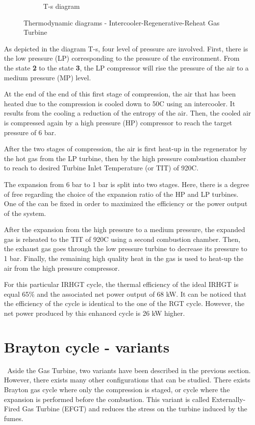 \begin{figure}[h]
\begin{subfigure}[b]{0.4\textwidth}
         \caption{T-s diagram}
         \label{fig:C5_Ts_IRHGT}
     \end{subfigure}
        \caption{Thermodynamic diagrams - Intercooler-Regenerative-Reheat Gas Turbine}
        \label{fig:C5_thermo_diagram_IRHGT}
\end{figure}

As depicted in the diagram T-s, four level of pressure are involved. First, there is the low pressure (LP) corresponding to the pressure of the environment. From the state \textbf{2} to the state \textbf{3}, the LP compressor will rise the pressure of the air to a medium pressure (MP) level. 

At the end of the end of this first stage of compression, the air that has been heated due to the compression is cooled down to 50\degree C using an intercooler. It results from the cooling a reduction of the entropy of the air. Then, the cooled air is compressed again by a high pressure (HP) compressor to reach the target pressure of 6 bar.

After the two stages of compression, the air is first heat-up in the regenerator by the hot gas from the LP turbine, then by the high pressure combustion chamber to reach to desired Turbine Inlet Temperature (or TIT) of 920\degree C. 

The expansion from 6 bar to 1 bar is split into two stages. Here, there is a degree of free regarding the choice of the expansion ratio of the HP and LP turbines. One of the can be fixed in order to maximized the efficiency or the power output of the system. 

After the expansion from the high pressure to a medium pressure, the expanded gas is reheated to the TIT of 920\degree C using a second combustion chamber. Then, the exhaust gas goes through the low pressure turbine to decrease its pressure to 1 bar. Finally, the remaining high quality heat in the gas is used to heat-up the air from the high pressure compressor.

For this particular IRHGT cycle, the thermal efficiency of the ideal IRHGT is equal 65\% and the associated net power output of 68 kW. It can be noticed that the efficiency of the cycle is identical to the one of the RGT cycle. However, the net power produced by this enhanced cycle is 26 kW higher. 

\section{Brayton cycle - variants}
\quad\ Aside the Gas Turbine, two variants have been described in the previous section. However, there exists many other configurations that can be studied. There exists Brayton gas cycle where only the compression is staged, or cycle where the expansion is performed before the combustion. This variant is called Externally-Fired Gas Turbine (EFGT) and reduces the stress on the turbine induced by the fumes.


